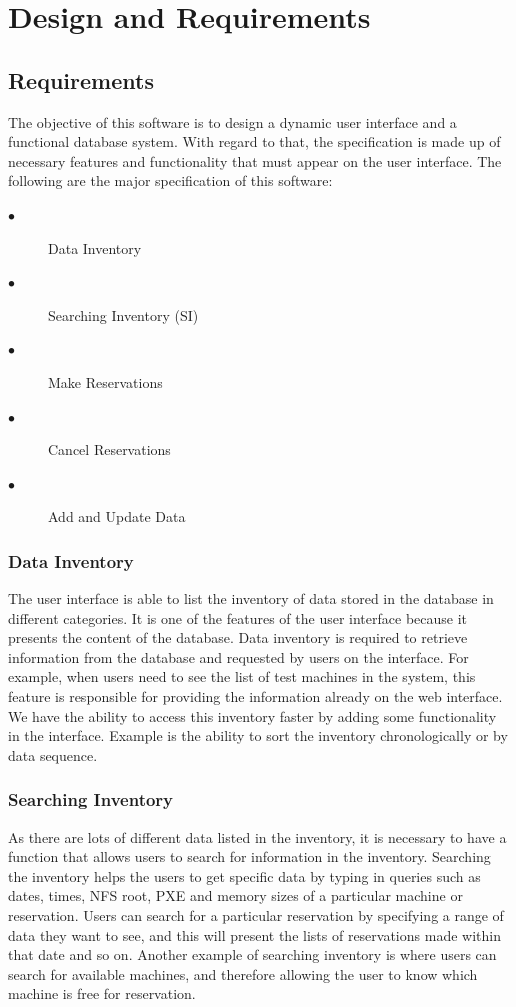 \chapter{Design and Requirements}
\label{chap:figtab}
\label{chap}
\section{Requirements}\label{requirements}
The objective of this software is to  design a dynamic user interface and a functional database system. With regard to that, the specification is made up of necessary features and functionality that must appear on the user interface. The following are the major specification of this software:
\begin{description}
\item[$\bullet$] Data Inventory
\item[$\bullet$] Searching Inventory (SI)
\item[$\bullet$] Make Reservations
\item[$\bullet$] Cancel Reservations
\item[$\bullet$] Add and Update Data
\end{description}
\subsection{Data Inventory}
The user interface is able to list the inventory of data stored in the database in different categories. It is one of the features of the user interface because it presents the content of the database. Data inventory is required to retrieve information from the database and requested by users on the interface. For example, when users need to see the list of test machines in the system, this feature is responsible for providing the information already on the web interface. We have the ability to access this inventory faster by adding some functionality in the interface. Example is the ability to sort the inventory chronologically or by data sequence. 
\subsection{Searching Inventory} \label{searchinventory}
As there are lots of different data listed in the inventory, it is necessary to have a function that allows users to search for information in the inventory. Searching the inventory helps the users to get specific data by typing in queries such as dates, times, NFS root, PXE and memory sizes of a particular machine or reservation. Users can search for a particular reservation by specifying a range of data they want to see, and this will present the lists of reservations made within that date and so on. Another example of searching inventory is where users can search for available machines, and therefore allowing the user to know which machine is free for reservation.
